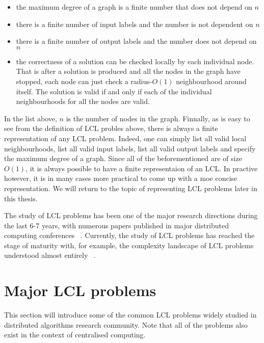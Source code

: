 \begin{itemize}

\item the maximum degree of a graph is a finite number that does not depend on $n$

\item there is a finite number of input labels and the number is not dependent on $n$

\item there is a finite number of output labels and the number does not depend on $n$

\item the correctness of a solution can be checked locally by each individual node. That is
after a solution is produced and all the nodes in the graph have stopped, each node can just
check a radius-$O(1)$ neighbourhood around itself. The solution is valid if and only if each of
the individual neighbourhoods for all the nodes are valid.

\end{itemize}
In the list above, $n$ is the number of nodes in the graph. Finnally, as is easy to see from the definition of LCL
probles
above, there is always a finite representation of any LCL problem. Indeed, one can simply list
all valid local neighbourhoods, list all valid input labels, list all valid output
labels and specify the maximum degree of a graph. Since all of the beforementioned are
of size $O(1)$, it is always possible to have a finite representaion of an LCL.
In practive however, it is in many cases more practical to come up with
a moe concise representation. We will return to the topic of representing LCL
problems later in this thesis.

The study of LCL problems has been one of the major research directions
during the last 6-7 years, with numerous papers published in major
distributed computing conferences
~\cite{Balliu2016, Chang2016, Brandt2017, Chang2017, Fischer2017a, Rozhon2019, Balliu2020-1, Balliu2020-2}.
Currently, the study of LCL problems has reached the stage of maturity with,
for example, the complexity landscape of LCL problems understood
almost entirely ~\cite{Suomela2020, Chang2020a}.

\section{Major LCL problems}

This section will introduce some of the common LCL problems
widely studied in distributed algorithms research community.
Note that all of the problems also exist in the context of 
centralised computing.

